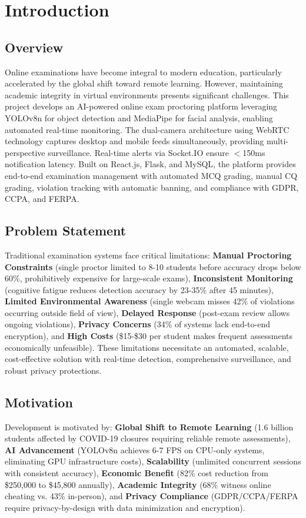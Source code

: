 \chapter{Introduction}

\section{Overview}
Online examinations have become integral to modern education, particularly accelerated by the global shift toward remote learning. However, maintaining academic integrity in virtual environments presents significant challenges. This project develops an AI-powered online exam proctoring platform leveraging YOLOv8n for object detection and MediaPipe for facial analysis, enabling automated real-time monitoring. The dual-camera architecture using WebRTC technology captures desktop and mobile feeds simultaneously, providing multi-perspective surveillance. Real-time alerts via Socket.IO ensure $<$150ms notification latency. Built on React.js, Flask, and MySQL, the platform provides end-to-end examination management with automated MCQ grading, manual CQ grading, violation tracking with automatic banning, and compliance with GDPR, CCPA, and FERPA.

\section{Problem Statement}
Traditional examination systems face critical limitations: \textbf{Manual Proctoring Constraints} (single proctor limited to 8-10 students before accuracy drops below 60\%, prohibitively expensive for large-scale exams), \textbf{Inconsistent Monitoring} (cognitive fatigue reduces detection accuracy by 23-35\% after 45 minutes), \textbf{Limited Environmental Awareness} (single webcam misses 42\% of violations occurring outside field of view), \textbf{Delayed Response} (post-exam review allows ongoing violations), \textbf{Privacy Concerns} (34\% of systems lack end-to-end encryption), and \textbf{High Costs} (\$15-\$30 per student makes frequent assessments economically unfeasible). These limitations necessitate an automated, scalable, cost-effective solution with real-time detection, comprehensive surveillance, and robust privacy protections.

\section{Motivation}
Development is motivated by: \textbf{Global Shift to Remote Learning} (1.6 billion students affected by COVID-19 closures requiring reliable remote assessments), \textbf{AI Advancement} (YOLOv8n achieves 6-7 FPS on CPU-only systems, eliminating GPU infrastructure costs), \textbf{Scalability} (unlimited concurrent sessions with consistent accuracy), \textbf{Economic Benefit} (82\% cost reduction from \$250,000 to \$45,800 annually), \textbf{Academic Integrity} (68\% witness online cheating vs. 43\% in-person), and \textbf{Privacy Compliance} (GDPR/CCPA/FERPA require privacy-by-design with data minimization and encryption).

